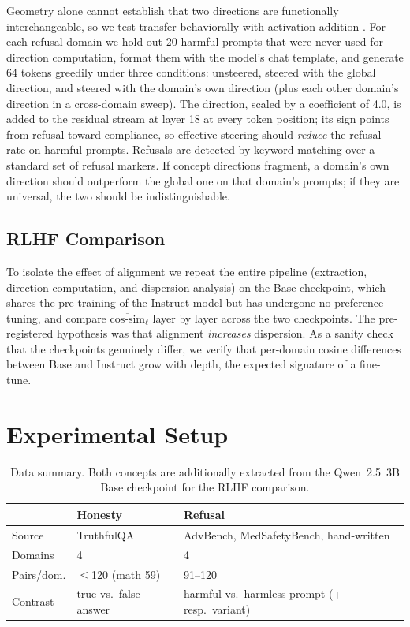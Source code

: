 \documentclass[11pt]{article}
\newcommand{\cosim}{\text{cos-sim}}
\begin{document}
Geometry alone cannot establish that two directions are functionally
interchangeable, so we test transfer behaviorally with activation addition
\citep{turner2023activation,li2024inference}. For each refusal domain we
hold out 20 harmful prompts that were never used for direction computation,
format them with the model's chat template, and generate 64 tokens greedily
under three conditions: unsteered, steered with the global direction, and
steered with the domain's own direction (plus each other domain's direction
in a cross-domain sweep). The direction, scaled by a coefficient of 4.0, is
added to the residual stream at layer 18 at every token position; its sign
points from refusal toward compliance, so effective steering should
\emph{reduce} the refusal rate on harmful prompts. Refusals are detected by
keyword matching over a standard set of refusal markers. If concept
directions fragment, a domain's own direction should outperform the global
one on that domain's prompts; if they are universal, the two should be
indistinguishable.

\subsection{RLHF Comparison}
\label{sec:rlhf-method}

To isolate the effect of alignment we repeat the entire pipeline
(extraction, direction computation, and dispersion analysis) on the Base
checkpoint, which shares the pre-training of the Instruct model but has
undergone no preference tuning, and compare
$\overline{\cosim}_\ell$ layer by layer across the two checkpoints. The
pre-registered hypothesis was that alignment \emph{increases} dispersion. As
a sanity check that the checkpoints genuinely differ, we verify that
per-domain cosine differences between Base and Instruct grow with depth, the
expected signature of a fine-tune.


\section{Experimental Setup}
\label{sec:setup}

\begin{table}[t]
  \centering
  \small
  \renewcommand{\arraystretch}{1.2}
  \begin{tabular}{@{}l p{2.0cm} p{2.7cm}@{}}
    \toprule
    & \textbf{Honesty} & \textbf{Refusal} \\
    \midrule
    Source & TruthfulQA & AdvBench, MedSafetyBench, hand-written \\
    Domains & 4 & 4 \\
    Pairs/dom. & $\le$120 (math 59) & 91--120 \\
    Contrast & true vs.\ false answer & harmful vs.\ harmless prompt (+ resp.\ variant) \\
    \bottomrule
  \end{tabular}
  \caption{Data summary. Both concepts are additionally extracted from the
  Qwen~2.5~3B Base checkpoint for the RLHF comparison.}
  \label{tab:setup}
\end{table}
\end{document}
